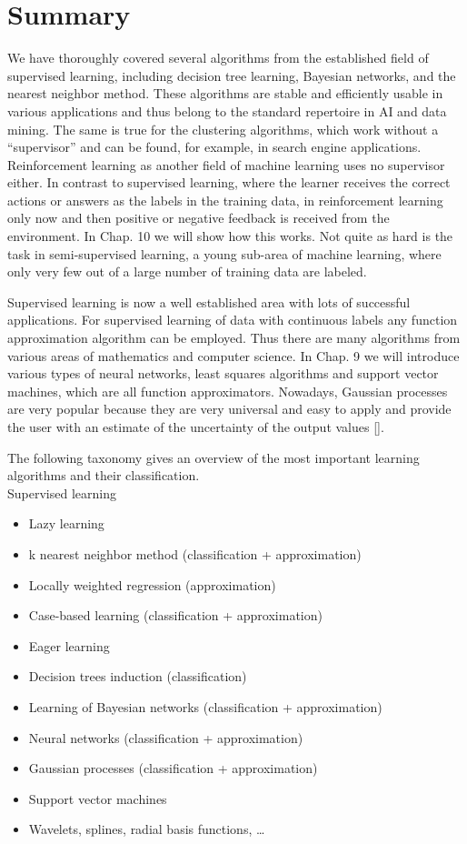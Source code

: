 \documentclass[10pt]{book}
\begin{document}
\section{Summary}
We have thoroughly covered several algorithms from the established field of supervised learning, including decision tree learning, Bayesian networks, and the nearest neighbor method. These algorithms are stable and efficiently usable in various applications and thus belong to the standard repertoire in AI and data mining. The same is true for the clustering algorithms, which work without a ``supervisor'' and can be found, for example, in search engine applications. Reinforcement learning as another field of machine learning uses no supervisor either. In contrast to supervised learning, where the learner receives the correct actions or answers as the labels in the training data, in reinforcement learning only now and then positive or negative feedback is received from the environment. In Chap. 10 we will show how this works. Not quite as hard is the task in semi-supervised learning, a young sub-area of machine learning, where only very few out of a large number of training data are labeled.

Supervised learning is now a well established area with lots of successful applications. For supervised learning of data with continuous labels any function approximation algorithm can be employed. Thus there are many algorithms from various areas of mathematics and computer science. In Chap. 9 we will introduce various types of neural networks, least squares algorithms and support vector machines, which are all function approximators. Nowadays, Gaussian processes are very popular because they are very universal and easy to apply and provide the user with an estimate of the uncertainty of the output values [\cite{rasmussen2006gpml}].

The following taxonomy gives an overview of the most important learning algorithms and their classification.\\
Supervised learning

\begin{itemize}
  \item Lazy learning
  \item k nearest neighbor method (classification + approximation)
  \item Locally weighted regression (approximation)
  \item Case-based learning (classification + approximation)
  \item Eager learning
  \item Decision trees induction (classification)
  \item Learning of Bayesian networks (classification + approximation)
  \item Neural networks (classification + approximation)
  \item Gaussian processes (classification + approximation)
  \item Support vector machines
  \item Wavelets, splines, radial basis functions, \ldots
\end{itemize}
\end{document}
